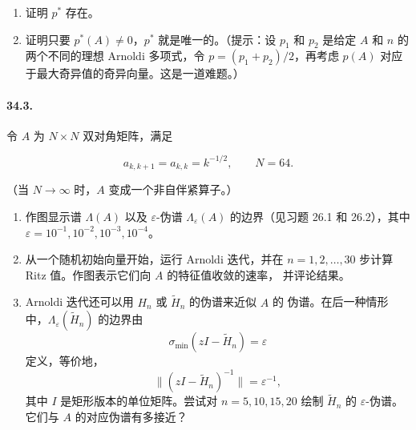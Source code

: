 \documentclass[UTF8,fontset=none,12pt]{ctexart}
\begin{document}
\begin{enumerate}[label=(\alph*)]
\item 证明 $p^*$ 存在。
\item 证明只要 $p^*(A)\ne0$，$p^*$ 就是唯一的。（提示：设 $p_1$ 和
$p_2$ 是给定 $A$ 和 $n$ 的两个不同的理想 Arnoldi 多项式，令
$p=(p_1+p_2)/2$，再考虑 $p(A)$ 对应于最大奇异值的奇异向量。这是一道难题。）
\end{enumerate}

\paragraph{34.3.}
令 $A$ 为 $N\times N$ 双对角矩阵，满足

\[
a_{k,k+1}=a_{k,k}=k^{-1/2},\qquad N=64.
\]

（当 $N\to\infty$ 时，$A$ 变成一个非自伴紧算子。）

\begin{enumerate}[label=(\alph*)]
\item 作图显示谱 $\Lambda(A)$ 以及 $\varepsilon$-伪谱
$\Lambda_\varepsilon(A)$ 的边界（见习题 26.1 和 26.2），其中
$\varepsilon=10^{-1},10^{-2},10^{-3},10^{-4}$。
\item 从一个随机初始向量开始，运行 Arnoldi 迭代，并在
$n=1,2,\ldots,30$ 步计算 Ritz 值。作图表示它们向 $A$ 的特征值收敛的速率，
并评论结果。
\item Arnoldi 迭代还可以用 $H_n$ 或 $\widetilde H_n$ 的伪谱来近似 $A$ 的
伪谱。在后一种情形中，$\Lambda_\varepsilon(\widetilde H_n)$ 的边界由
\[
\sigma_{\min}(zI-\widetilde H_n)=\varepsilon
\]
定义，等价地，
\[
\lVert(zI-\widetilde H_n)^{-1}\rVert=\varepsilon^{-1},
\]
其中 $I$ 是矩形版本的单位矩阵。尝试对 $n=5,10,15,20$ 绘制
$\widetilde H_n$ 的 $\varepsilon$-伪谱。它们与 $A$ 的对应伪谱有多接近？
\end{enumerate}
\end{document}
